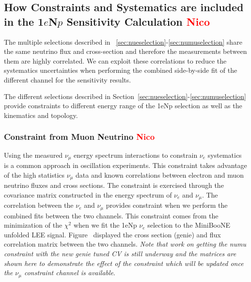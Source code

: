 \documentclass[a4paper]{article}
\begin{document}
\subsection{How Constraints and Systematics are included in the 1$e$N$p$ Sensitivity Calculation \textcolor{red}{Nico}}

The multiple selections described in  ~\ref{sec:nueselection}-\ref{sec:numuselection} share the same neutrino flux and cross-section and therefore the measurements between them are highly correlated. We can exploit these correlations to reduce the systematics uncertainties when performing the combined side-by-side fit of the different channel for the sensitivity results.

The different selections described in Section~\ref{sec:nueselection}-\ref{sec:numuselection} provide constraints to different energy range of the 1eNp selection as well as the kinematics and topology.

\subsubsection{Constraint from Muon Neutrino \textcolor{red}{Nico}}
Using the measured $\nu_{\mu}$ energy spectrum interactions to constrain $\nu_e$ systematics is a common approach in oscillation experiments. 
This constraint takes advantage of the high statistics $\nu_{\mu}$ data and known correlations between electron and muon neutrino fluxes and cross sections. 
The constraint is exercised through the covariance matrix constructed in the energy spectrum of $\nu_e$ and $\nu_{\mu}$. 
The correlation between the $\nu_e$ and $\nu_{\mu}$ provides constraint when we perform the combined fits between the two channels. This constraint comes from the minimization of the $\chi^2$ when we fit the 1eNp $\nu_e$ selection to the MiniBooNE unfolded LEE signal. Figure~\cite{fig:numuconstraint} displayed the cross section (genie) and flux correlation matrix between the two channels. \textit{Note that work on getting the numu constraint with the new genie tuned CV is still underway and the matrices are shown here to demonstrate the effect of the constraint which will be updated once the $\nu_{\mu}$ constraint channel is available}.
\end{document}
